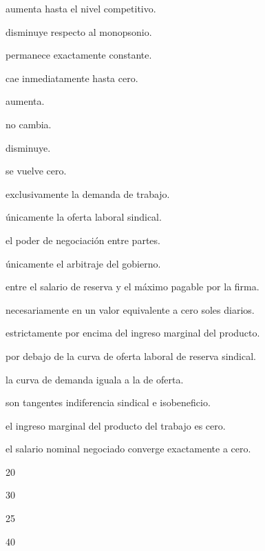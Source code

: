 \begin{opts}
    \item aumenta hasta el nivel competitivo.
    \item disminuye respecto al monopsonio.
    \item permanece exactamente constante.
    \item cae inmediatamente hasta cero.
\end{opts}

\begin{opts}
    \item aumenta.
    \item no cambia.
    \item disminuye.
    \item se vuelve cero.
\end{opts}

\begin{opts}
    \item exclusivamente la demanda de trabajo.
    \item únicamente la oferta laboral sindical.
    \item el poder de negociación entre partes.
    \item únicamente el arbitraje del gobierno.
\end{opts}

\begin{opts}
    \item entre el salario de reserva y el máximo pagable por la firma.
    \item necesariamente en un valor equivalente a cero soles diarios.
    \item estrictamente por encima del ingreso marginal del producto.
    \item por debajo de la curva de oferta laboral de reserva sindical.
\end{opts}

\begin{opts}
    \item la curva de demanda iguala a la de oferta.
    \item son tangentes indiferencia sindical e isobeneficio.
    \item el ingreso marginal del producto del trabajo es cero.
    \item el salario nominal negociado converge exactamente a cero.
\end{opts}

\begin{opts}
    \item 20
    \item 30
    \item 25
    \item 40
\end{opts}
